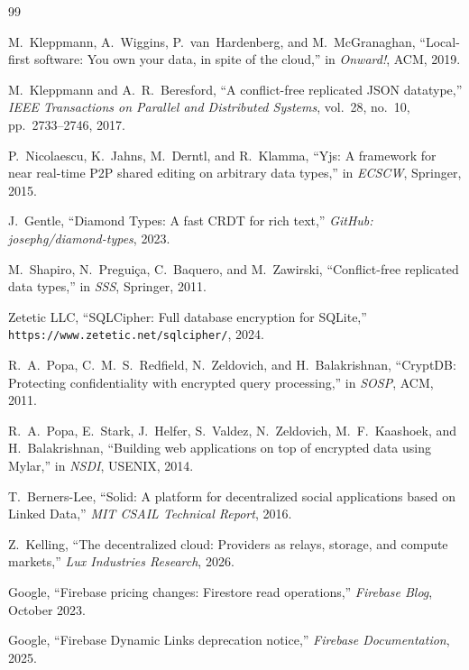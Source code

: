 \documentclass[11pt,a4paper]{article}
\begin{document}
\begin{thebibliography}{99}

M.~Kleppmann, A.~Wiggins, P.~van~Hardenberg, and M.~McGranaghan, ``Local-first software: You own your data, in spite of the cloud,'' in \emph{Onward!}, ACM, 2019.

M.~Kleppmann and A.~R.~Beresford, ``A conflict-free replicated JSON datatype,'' \emph{IEEE Transactions on Parallel and Distributed Systems}, vol.~28, no.~10, pp.~2733--2746, 2017.

P.~Nicolaescu, K.~Jahns, M.~Derntl, and R.~Klamma, ``Yjs: A framework for near real-time P2P shared editing on arbitrary data types,'' in \emph{ECSCW}, Springer, 2015.

J.~Gentle, ``Diamond Types: A fast CRDT for rich text,'' \emph{GitHub: josephg/diamond-types}, 2023.

M.~Shapiro, N.~Pregui\c{c}a, C.~Baquero, and M.~Zawirski, ``Conflict-free replicated data types,'' in \emph{SSS}, Springer, 2011.

Zetetic LLC, ``SQLCipher: Full database encryption for SQLite,'' \texttt{https://www.zetetic.net/sqlcipher/}, 2024.

R.~A.~Popa, C.~M.~S.~Redfield, N.~Zeldovich, and H.~Balakrishnan, ``CryptDB: Protecting confidentiality with encrypted query processing,'' in \emph{SOSP}, ACM, 2011.

R.~A.~Popa, E.~Stark, J.~Helfer, S.~Valdez, N.~Zeldovich, M.~F.~Kaashoek, and H.~Balakrishnan, ``Building web applications on top of encrypted data using Mylar,'' in \emph{NSDI}, USENIX, 2014.

T.~Berners-Lee, ``Solid: A platform for decentralized social applications based on Linked Data,'' \emph{MIT CSAIL Technical Report}, 2016.

Z.~Kelling, ``The decentralized cloud: Providers as relays, storage, and compute markets,'' \emph{Lux Industries Research}, 2026.

Google, ``Firebase pricing changes: Firestore read operations,'' \emph{Firebase Blog}, October 2023.

Google, ``Firebase Dynamic Links deprecation notice,'' \emph{Firebase Documentation}, 2025.

\end{thebibliography}
\end{document}
